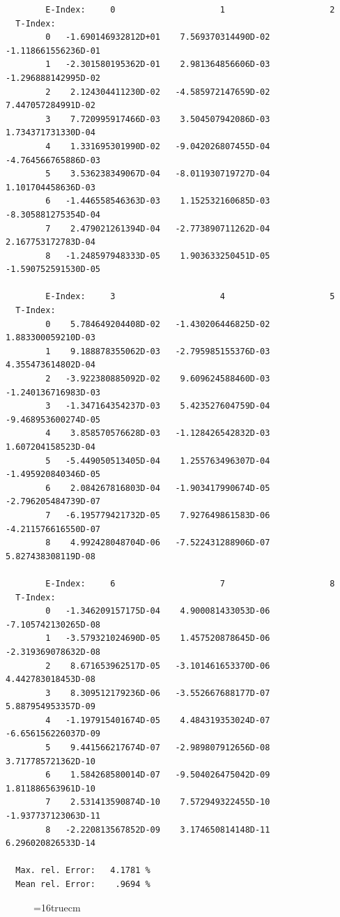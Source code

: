 \documentclass[12pt,dvips]{article}
\begin{document}
\begin{small}\begin{verbatim}
        E-Index:     0                     1                     2
  T-Index:
        0   -1.690146932812D+01    7.569370314490D-02   -1.118661556236D-01
        1   -2.301580195362D-01    2.981364856606D-03   -1.296888142995D-02
        2    2.124304411230D-02   -4.585972147659D-02    7.447057284991D-02
        3    7.720995917466D-03    3.504507942086D-03    1.734371731330D-04
        4    1.331695301990D-02   -9.042026807455D-04   -4.764566765886D-03
        5    3.536238349067D-04   -8.011930719727D-04    1.101704458636D-03
        6   -1.446558546363D-03    1.152532160685D-03   -8.305881275354D-04
        7    2.479021261394D-04   -2.773890711262D-04    2.167753172783D-04
        8   -1.248597948333D-05    1.903633250451D-05   -1.590752591530D-05

        E-Index:     3                     4                     5
  T-Index:
        0    5.784649204408D-02   -1.430206446825D-02    1.883300059210D-03
        1    9.188878355062D-03   -2.795985155376D-03    4.355473614802D-04
        2   -3.922380885092D-02    9.609624588460D-03   -1.240136716983D-03
        3   -1.347164354237D-03    5.423527604759D-04   -9.468953600274D-05
        4    3.858570576628D-03   -1.128426542832D-03    1.607204158523D-04
        5   -5.449050513405D-04    1.255763496307D-04   -1.495920840346D-05
        6    2.084267816803D-04   -1.903417990674D-05   -2.796205484739D-07
        7   -6.195779421732D-05    7.927649861583D-06   -4.211576616550D-07
        8    4.992428048704D-06   -7.522431288906D-07    5.827438308119D-08

        E-Index:     6                     7                     8
  T-Index:
        0   -1.346209157175D-04    4.900081433053D-06   -7.105742130265D-08
        1   -3.579321024690D-05    1.457520878645D-06   -2.319369078632D-08
        2    8.671653962517D-05   -3.101461653370D-06    4.442783018453D-08
        3    8.309512179236D-06   -3.552667688177D-07    5.887954953357D-09
        4   -1.197915401674D-05    4.484319353024D-07   -6.656156226037D-09
        5    9.441566217674D-07   -2.989807912656D-08    3.717785721362D-10
        6    1.584268580014D-07   -9.504026475042D-09    1.811886563961D-10
        7    2.531413590874D-10    7.572949322455D-10   -1.937737123063D-11
        8   -2.220813567852D-09    3.174650814148D-11    6.296020826533D-14

  Max. rel. Error:   4.1781 %
  Mean rel. Error:    .9694 %
\end{verbatim}\end{small}
\begin{figure} \label{7.2.3a}
\epsfxsize=16truecm
\end{figure}
\newpage
\end{document}
